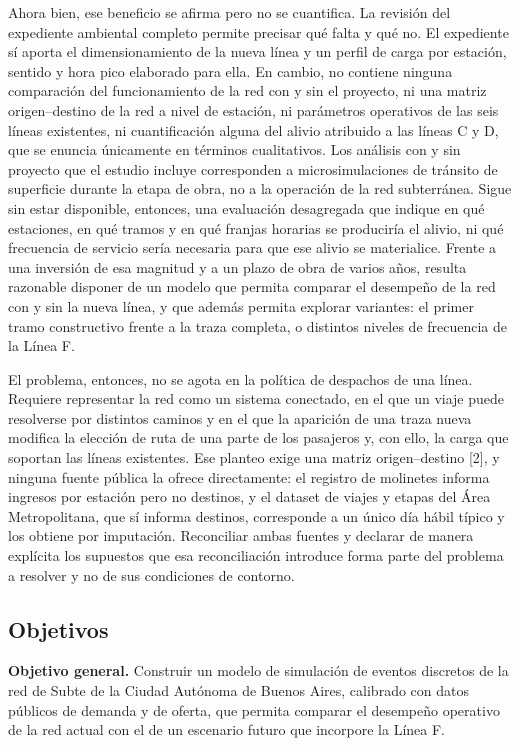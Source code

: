 \documentclass{article}
\begin{document}
Ahora bien, ese beneficio se afirma pero no se cuantifica. La revisión del expediente ambiental completo
permite precisar qué falta y qué no. El expediente sí aporta el dimensionamiento de la nueva línea y un
perfil de carga por estación, sentido y hora pico elaborado para ella. En cambio, no contiene ninguna
comparación del funcionamiento de la red con y sin el proyecto, ni una matriz origen--destino de la red a
nivel de estación, ni parámetros operativos de las seis líneas existentes, ni cuantificación alguna del
alivio atribuido a las líneas C y D, que se enuncia únicamente en términos cualitativos. Los análisis con y
sin proyecto que el estudio incluye corresponden a microsimulaciones de tránsito de superficie durante la
etapa de obra, no a la operación de la red subterránea. Sigue sin estar disponible, entonces, una evaluación
desagregada que indique en qué estaciones, en qué tramos y en qué franjas horarias se produciría el alivio,
ni qué frecuencia de servicio sería necesaria para que ese alivio se materialice. Frente a una inversión de
esa magnitud y a un plazo de obra de varios años, resulta razonable disponer de un modelo que permita
comparar el desempeño de la red con y sin la nueva línea, y que además permita explorar variantes: el primer
tramo constructivo frente a la traza completa, o distintos niveles de frecuencia de la Línea F.

El problema, entonces, no se agota en la política de despachos de una línea. Requiere representar la red
como un sistema conectado, en el que un viaje puede resolverse por distintos caminos y en el que la
aparición de una traza nueva modifica la elección de ruta de una parte de los pasajeros y, con ello, la
carga que soportan las líneas existentes. Ese planteo exige una matriz origen--destino [2], y ninguna fuente
pública la ofrece directamente: el registro de molinetes informa ingresos por estación pero no destinos, y
el dataset de viajes y etapas del Área Metropolitana, que sí informa destinos, corresponde a un único día
hábil típico y los obtiene por imputación. Reconciliar ambas fuentes y declarar de manera explícita los
supuestos que esa reconciliación introduce forma parte del problema a resolver y no de sus condiciones de
contorno.

\subsection{Objetivos}

\textbf{Objetivo general.} Construir un modelo de simulación de eventos discretos de la red de Subte de la
Ciudad Autónoma de Buenos Aires, calibrado con datos públicos de demanda y de oferta, que permita comparar
el desempeño operativo de la red actual con el de un escenario futuro que incorpore la Línea F.
\end{document}
